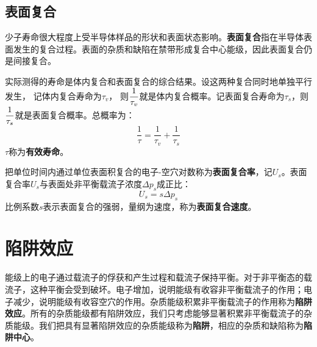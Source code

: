 \subsection{表面复合}

少子寿命很大程度上受半导体样品的形状和表面状态影响。\textbf{表面复合}指在半导体表面发生的复合过程。表面的杂质和缺陷在禁带形成复合中心能级，因此表面复合仍是间接复合。

实际测得的寿命是体内复合和表面复合的综合结果。设这两种复合同时地单独平行发生，\vspace{1ex}
记体内复合寿命为$\tau_v$，
\vspace{1ex}则$\displaystyle \frac{1}{\tau_v}$就是体内复合概率。记表面复合寿命为$\tau_s$，则$\displaystyle \frac{1}{\tau_s}$就是表面复合概率。总概率为：
\begin{equation}
    \frac{1}{\tau}=\frac{1}{\tau_v}+\frac{1}{\tau_s}
\end{equation}
$\tau$称为\textbf{有效寿命}。

把单位时间内通过单位表面积复合的电子-空穴对数称为\textbf{表面复合率}，记$U_s$。表面复合率$U_s$与表面处非平衡载流子浓度$\Delta p_s$成正比：
\begin{equation}
    U_s=s\Delta p_s
\end{equation}
比例系数$s$表示表面复合的强弱，量纲为速度，称为\textbf{表面复合速度}。

\section{陷阱效应}

能级上的电子通过载流子的俘获和产生过程和载流子保持平衡。对于非平衡态的载流子，这种平衡会受到破坏。电子增加，说明能级有收容非平衡载流子的作用；电子减少，说明能级有收容空穴的作用。杂质能级积累非平衡载流子的作用称为\textbf{陷阱效应}。所有的杂质能级都有陷阱效应，我们只考虑能够显著积累非平衡载流子的杂质能级。我们把具有显著陷阱效应的杂质能级称为\textbf{陷阱}，相应的杂质和缺陷称为\textbf{陷阱中心}。


